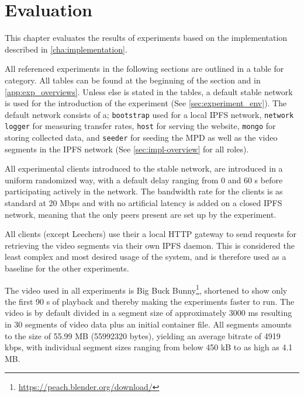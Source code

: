 \chapter{Evaluation}
\label{cha:evaluation}
This chapter evaluates the results of experiments based on the implementation described in \autoref{cha:implementation}.

All referenced experiments in the following sections are outlined in a table for category. All tables can be found at the beginning of the section and in \autoref{app:exp_overviews}. Unless else is stated in the tables, a default stable network is used for the introduction of the experiment (See \autoref{sec:experiment_env}). The default network consists of a; \texttt{bootstrap} used for a local \ac{IPFS} network, \texttt{network logger} for measuring transfer rates, \texttt{host} for serving the website, \texttt{mongo} for storing collected data, and \texttt{seeder} for seeding the \ac{MPD} as well as the video segments in the \ac{IPFS} network (See  \autoref{sec:impl-overview} for all roles).

All experimental clients introduced to the stable network, are introduced in a uniform randomized way, with a default delay ranging from 0 and 60 \ac{s} before participating actively in the network.
The bandwidth rate for the clients is as standard at 20 \ac{Mbps} and with no artificial latency is added on a closed \ac{IPFS} network, meaning that the only peers present are set up by the experiment.

All clients (except Leechers) use their a local \ac{HTTP} gateway to send requests for retrieving the video segments via their own \ac{IPFS} daemon. This is considered the least complex and most desired usage of the system, and is therefore used as a baseline for the other experiments.

The video used in all experiments is Big Buck Bunny\footnote{\url{https://peach.blender.org/download/}}, shortened to show only the first 90 \ac{s} of playback and thereby making the experiments faster to run. The video is by default divided in a segment size of approximately 3000 \ac{ms} resulting in 30 segments of video data plus an initial container file. All segments amounts to the size of 55.99 \ac{MB} (55992320 bytes), yielding an average bitrate of 4919 \ac{kbps}, with individual segment sizes ranging from below 450 \ac{kB} to as high as 4.1 \ac{MB}.

